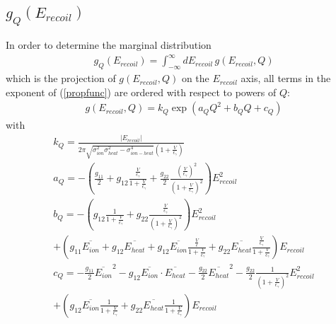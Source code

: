\subsection{$g_Q(E_{recoil})$}
In order to determine the marginal distribution
\begin{gather}
g_Q(E_{recoil}) = \int_{-\infty}^\infty dE_{recoil} \, g(E_{recoil},Q)
\end{gather}
which is the projection of $g(E_{recoil},Q)$ on the $E_{recoil}$ axis, 
all terms in the exponent of (\ref{propfunc}) are ordered 
with respect to powers of $Q$:
\begin{gather}
g(E_{recoil},Q) = k_Q  \exp ( a_Q Q^2 +
b_Q Q + c_Q ) \label{propfuncQ}
\end{gather}
with
\begin{gather}
k_Q = \frac{\left| E_{recoil} \right| }{2 \pi \sqrt{\sigma_{ion}^2 \sigma_{heat}^2 - \sigma_{ion-heat}^4}
 \left(1 + \frac{V}{\epsilon_\gamma}\right)} \\
a_Q = - \left( \frac{g_{11}}{2} + g_{12} \frac{\frac{V}{\epsilon_\gamma}}{1+ \frac{V}{\epsilon_\gamma}} + \frac{g_{22}}{2} 
\frac{ \left( \frac{V}{\epsilon_\gamma} \right)^2}{\left( 1 + \frac{V}{\epsilon_\gamma} \right)^2} \right) E_{recoil}^2  \\
b_Q = - \left( g_{12} \frac{1}{1 + \frac{V}{\epsilon_\gamma}}
+ g_{22} \frac{\frac{V}{\epsilon_\gamma}}{\left(1 + \frac{V}{\epsilon_\gamma} \right)^2} \right) E_{recoil}^2 \\ + \left(g_{11} \overline{E_{ion}} 
 + g_{12} \overline{E_{heat}}  + g_{12} \overline{E_{ion}} \frac{\frac{V}{\epsilon}}{1+ \frac{V}{\epsilon_\gamma}}  + g_{22} \overline{E_{heat}} \frac{\frac{V}{\epsilon_\gamma}}{1+ \frac{V}{\epsilon_\gamma}} \right) E_{recoil}  \\
c_Q = - \frac{g_{11}}{2} \overline{E_{ion}}^2 - g_{12} \overline{E_{ion}} \cdot \overline{E_{heat}} - \frac{g_{22}}{2} \overline{E_{heat}}^2 - \frac{g_{22}}{2} \frac{1}{\left(1 + \frac{V}{\epsilon_\gamma} \right)^2} E_{recoil}^2 \\
+ \left( g_{12} \overline{E_{ion}} \frac{1}{1+ \frac{V}{\epsilon_\gamma}} 
+ g_{22} \overline{E_{heat}} \frac{1}{1 + \frac{V}{\epsilon_\gamma}} \right) E_{recoil}
\end{gather}
\newpage
